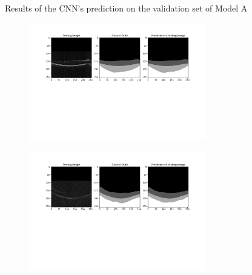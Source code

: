 \documentclass[12pt,a4paper]{scrartcl}
\begin{document}
\begin{figure}
\begin{subfigure}{1\textwidth}
    \caption{}
    \label{fig:results:A:c}
   \end{subfigure}
   \caption{Results of the CNN's prediction on the validation set of Model A}
  \label{Results}
\end{figure}

\begin{figure} 
   \centering
   \begin{subfigure}{1\textwidth}
    \centering
    \includegraphics[trim= 100 250 80 0, clip, width=0.85\textwidth]{./images/results/B_syntethic_groundtruth_predictions29052021-081035_0.png}
    \caption{}
    \label{fig:results:B:a}
   \end{subfigure}
   \begin{subfigure}{1\textwidth}
    \centering
    \includegraphics[trim= 100 250 80 0, clip, width=0.85\textwidth]{./images/results/B_syntethic_groundtruth_predictions29052021-081035_4.png}
    \caption{}
    \label{fig:results:B:b}
   \end{subfigure}
    \begin{subfigure}{1\textwidth}
    \centering

\end{subfigure}
\end{figure}
\end{document}
